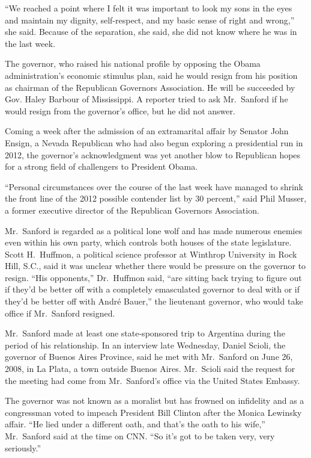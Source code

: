 ﻿\documentclass[12pt]{article}
\begin{document}
``We reached a point where I felt it was important to look my sons in the eyes and maintain my
dignity, self-respect, and my basic sense of right and wrong,'' she said. Because of the separation,
she said, she did not know where he was in the last week.

The governor, who raised his national profile by opposing the Obama administration's economic
stimulus plan, said he would resign from his position as chairman of the Republican Governors
Association. He will be succeeded by Gov. Haley Barbour of Mississippi. A reporter tried to ask
Mr.~Sanford if he would resign from the governor's office, but he did not answer.

Coming a week after the admission of an extramarital affair by Senator John Ensign, a Nevada
Republican who had also begun exploring a presidential run in 2012, the governor's acknowledgment
was yet another blow to Republican hopes for a strong field of challengers to President Obama.

``Personal circumstances over the course of the last week have managed to shrink the front line of
the 2012 possible contender list by 30 percent,'' said Phil Musser, a former executive director of
the Republican Governors Association.

Mr.~Sanford is regarded as a political lone wolf and has made numerous enemies even within his own
party, which controls both houses of the state legislature. Scott H.~Huffmon, a political science
professor at Winthrop University in Rock Hill, S.C., said it was unclear whether there would be
pressure on the governor to resign. ``His opponents,'' Dr.~Huffmon said, ``are sitting back trying
to figure out if they'd be better off with a completely emasculated governor to deal with or if
they'd be better off with Andr\'e Bauer,'' the lieutenant governor, who would take office if
Mr.~Sanford resigned.

Mr.~Sanford made at least one state-sponsored trip to Argentina during the period of his
relationship. In an interview late Wednesday, Daniel Scioli, the governor of Buenos Aires Province,
said he met with Mr.~Sanford on June 26, 2008, in La Plata, a town outside Buenos Aires. Mr.~Scioli
said the request for the meeting had come from Mr.~Sanford's office via the United States Embassy.

The governor was not known as a moralist but has frowned on infidelity and as a congressman voted to
impeach President Bill Clinton after the Monica Lewinsky affair. ``He lied under a different oath,
and that's the oath to his wife,'' Mr.~Sanford said at the time on CNN. ``So it's got to be taken
very, very seriously.''
\end{document}
